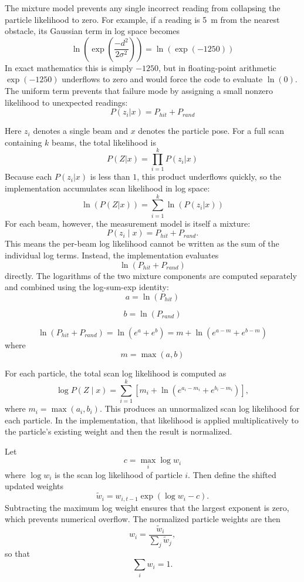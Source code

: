 \documentclass[11pt]{article}
\begin{document}
\noindent The mixture model prevents any single incorrect reading from collapsing the particle likelihood to zero. For
          example, if a reading is \SI{5}{m} from the nearest obstacle, its Gaussian term in log space becomes
\[
\ln \left( \exp \left(\frac{-d^2}{2\sigma^2}\right) \right)
=
\ln(\exp(-1250))
\]
\noindent In exact mathematics this is simply \(-1250\), but in floating-point arithmetic \(\exp(-1250)\) underflows to
          zero and would force the code to evaluate \(\ln(0)\). The uniform term prevents that failure mode by
          assigning a small nonzero likelihood to unexpected readings:
\[
P(z_i|x) = P_{hit} + P_{rand}
\]

\noindent Here \(z_i\) denotes a single beam and \(x\) denotes the particle pose. For a full scan containing \(k\)
          beams, the total likelihood is
\[
P(Z|x) = \prod_{i=1}^{k} P(z_i|x)
\]
\noindent Because each \(P(z_i|x)\) is less than \(1\), this product underflows quickly, so the implementation
          accumulates scan likelihood in log space:
\[
\ln(P(Z|x)) = \sum_{i=1}^{k} \ln(P(z_i|x))
\]
\noindent For each beam, however, the measurement model is itself a mixture:
\[
P(z_i \mid x) = P_{hit} + P_{rand}.
\]
This means the per-beam log likelihood cannot be written as the sum of the individual log terms. Instead, the
implementation evaluates
\[
\ln(P_{hit} + P_{rand})
\]
\noindent directly. The logarithms of the two mixture components are computed separately and combined
          using the log-sum-exp identity:
\[
a = \ln(P_{hit})
\]

\[
b = \ln(P_{rand})
\]

\[
\ln(P_{hit}+P_{rand})
=
\ln(e^a + e^b)
=
m + \ln(e^{a-m} + e^{b-m})
\]
\noindent where
\[
m = \max(a,b)
\]

\noindent For each particle, the total scan log likelihood is computed as
\[
\log P(Z \mid x)
=
\sum_{i=1}^{k}
\left[
m_i + \ln\!\left(e^{a_i-m_i}+e^{b_i-m_i}\right)
\right],
\]
where \(m_i = \max(a_i, b_i)\). This produces an unnormalized scan log likelihood for each particle. In the
implementation, that likelihood is applied multiplicatively to the particle's existing weight and then the result is
normalized.

\noindent Let
\[
c = \max_i \log w_i
\]
where \(\log w_i\) is the scan log likelihood of particle \(i\). Then define the shifted updated weights
\[
\tilde{w}_i = w_{i,t-1}\exp(\log w_i - c).
\]
Subtracting the maximum log weight ensures that the largest exponent is zero, which prevents numerical overflow. The
normalized particle weights are then
\[
w_i = \frac{\tilde{w}_i}{\sum_j \tilde{w}_j},
\]
so that
\[
\sum_i w_i = 1.
\]
\end{document}
